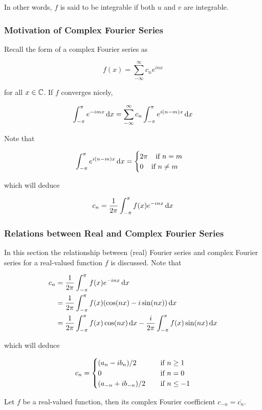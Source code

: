 \documentclass[a4paper,12pt]{article}
\begin{document}
In other words, $f$ is said to be integrable if both $u$ and $v$ are integrable.

\subsubsection{Motivation of Complex Fourier Series}
Recall the form of a complex Fourier series as

$$f(x)=\sum_{-\infty}^{\infty}c_{n}e^{inx}$$\s

for all $x\in\mathbb{C}$. If $f$ converges nicely,

$$\int_{-\pi}^{\pi}e^{-imx}\,\mathrm{d} x=\sum_{-\infty}^{\infty}c_{n}\int_{-\pi}^{\pi}e^{i(n-m)x}\,\mathrm{d} x$$\s

Note that

$$\int_{-\pi}^{\pi}e^{i(n-m)x}\,\mathrm{d} x=\begin{cases}
  2\pi\;\;\;\;\text{if }n=m\\
  0\;\;\;\;\text{if }n\neq m
\end{cases}$$\s

which will deduce

$$c_{n}=\frac{1}{2\pi}\int_{-\pi}^{\pi}f(x)e^{-inx}\,\mathrm{d} x$$

\subsubsection{Relations between Real and Complex Fourier Series}
In this section the relationship between (real) Fourier series and complex Fourier series for a real-valued function $f$ is discussed. Note that

$$\begin{aligned}[t]
  c_{n}&=\frac{1}{2\pi}\int_{-\pi}^{\pi}f(x)e^{-inx}\,\mathrm{d} x\\
  &=\frac{1}{2\pi}\int_{-\pi}^{\pi}f(x)(\cos(nx)-i\sin(nx))\,\mathrm{d} x\\
  &=\frac{1}{2\pi}\int_{-\pi}^{\pi}f(x)\cos(nx)\,\mathrm{d} x-\frac{i}{2\pi}\int_{-\pi}^{\pi}f(x)\sin(nx)\,\mathrm{d} x
\end{aligned}$$\s

which will deduce

$$c_{n}=\begin{cases}
  (a_{n}-ib_{n})/2&\;\;\;\;\text{if }n\geq 1\\
  0&\;\;\;\;\text{if }n=0\\
  (a_{-n}+ib_{-n})/2&\;\;\;\;\text{if }n\leq -1
\end{cases}$$\s

\begin{pst}
  Let $f$ be a real-valued function, then its complex Fourier coefficient $c_{-n}=\overline{c_{n}}$.
\end{pst}\n
\end{document}
